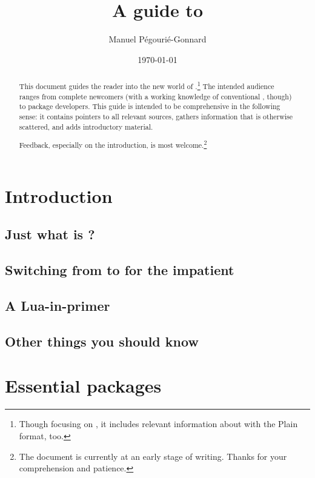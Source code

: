 \documentclass{lltxdoc}
\title{A guide to \lualatex}
\author{Manuel Pégourié-Gonnard \\ \email{mpg@elzevir.fr}}
\date{\today}
\begin{document}
\maketitle

\begin{abstract}
  This document guides the reader into the new world of
  \lualatex.\footnote{Though focusing on \lualatex, it includes relevant
    information about \luatex with the Plain format, too.} The intended
  audience ranges from complete newcomers (with a working knowledge of
  conventional \latex, though) to package developers. This guide is
  intended to be comprehensive in the following sense: it contains pointers to
  all relevant sources, gathers information that is otherwise scattered,
  and adds introductory material.

  Feedback, especially on the introduction, is most welcome.\footnote{The
    document is currently at an early stage of writing.  Thanks for your
    comprehension and patience.}
\end{abstract}

\setcounter{tocdepth}{2}
\tableofcontents
\clearpage

\section{Introduction}

\subsection{Just what is \lualatex?}

\subsection{Switching from \latex to \lualatex for the impatient}

\subsection{A Lua-in-\tex primer}

\subsection{Other things you should know}

\section{Essential packages}
\end{document}
